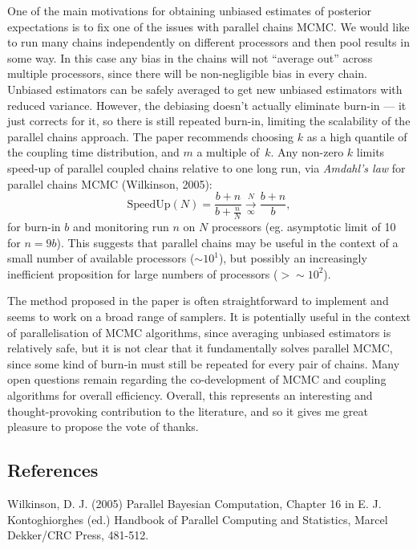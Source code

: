 \documentclass[11pt,a4paper]{article}
\begin{document}
One of the main motivations for obtaining unbiased estimates of posterior expectations is to fix one of the issues with parallel chains MCMC.
We would like to run many chains independently on different processors and then pool results in some way.
In this case any bias in the chains will not ``average out'' across multiple processors, since there will be non-negligible bias in every chain.
Unbiased estimators can be safely averaged to get new unbiased estimators with reduced variance.
However, the debiasing doesn't actually eliminate burn-in --- it just corrects for it, so there is still repeated burn-in, limiting the scalability of the parallel chains approach. The paper recommends choosing $k$ as a high quantile of the coupling time distribution, and $m$ a multiple of~$k$. Any non-zero $k$ limits speed-up of parallel coupled chains relative to one long run, via \emph{Amdahl's law} for parallel chains MCMC (Wilkinson, 2005):
    \[
\text{SpeedUp}(N) = \frac{b+n}{b+\frac{n}{N}} \overset{N}{\underset{\infty}{\longrightarrow}} \frac{b+n}{b},
    \]
    for burn-in $b$ and monitoring run $n$ on $N$ processors (eg. asymptotic limit of 10 for $n=9b$). This suggests that parallel chains may be useful in the context of a small number of available processors ($\sim 10^1$), but possibly an increasingly inefficient proposition for large numbers of processors ($>\sim 10^{2}$).

 The method proposed in the paper is often straightforward to implement and seems to work on a broad range of samplers.
It is potentially useful in the context of parallelisation of MCMC algorithms, since averaging unbiased estimators is relatively safe, but it is not clear that it fundamentally solves parallel MCMC, since some kind of burn-in must still be repeated for every pair of chains.
Many open questions remain regarding the co-development of MCMC and coupling algorithms for overall efficiency.
Overall, this represents an interesting and thought-provoking contribution to the literature, and so it gives me great pleasure to propose the vote of thanks.

  \subsection*{References}

  \begin{description}
\item Wilkinson, D. J. (2005) Parallel Bayesian Computation, Chapter 16 in E. J. Kontoghiorghes (ed.) Handbook of Parallel Computing and Statistics, Marcel Dekker/CRC Press, 481-512.
    \end{description}
  
\end{document}
